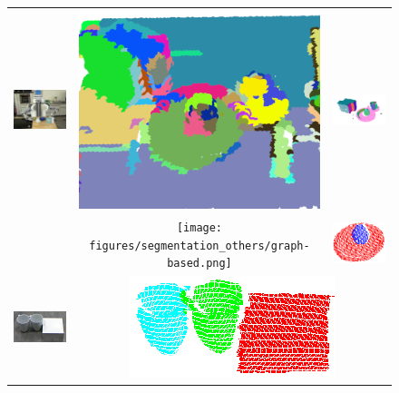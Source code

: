 \setlength{\tabcolsep}{0.1em}
\begin{figure}[ht]
\begin{tabular}{cccc}
\multicolumn{2}{c}{\multirow{-6}{*}{\includegraphics[width=0.5\columnwidth]{figures/teaser/IMG_0395.JPG}
}} & \includegraphics[width=0.23\columnwidth]{figures/segmentation_others/region_growing_rgb.png} 
&\includegraphics[width=0.23\columnwidth]{figures/segmentation_others/part-graph-hashing.png} \\
\multicolumn{2}{c}{} & \texttt{[image: figures/segmentation\_others/graph-based.png]} 
&\includegraphics[width=0.23\columnwidth]{pictures/teaser_egg_result-cropped.png} \\
\multicolumn{2}{c}{\includegraphics[width=0.45\columnwidth]{figures/3objects/after_push.jpg}}
& \multicolumn{2}{c}{\includegraphics[width=0.45\columnwidth]{figures/3objects/segmented.png}}

\end{tabular}
\end{figure}

